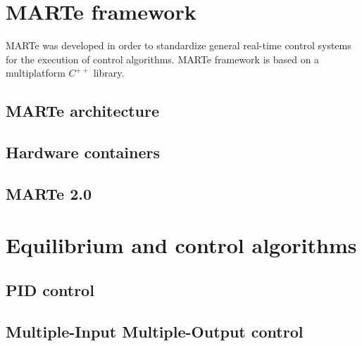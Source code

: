 \section{MARTe framework}

MARTe was developed in order to standardize general real-time control systems for the execution of control algorithms. MARTe framework is based on a multiplatform $C^{++}$ library. \cite{Neto2011} 

\subsection{MARTe architecture }
\subsection{Hardware containers}
\subsection{MARTe 2.0}
\section{Equilibrium and control algorithms} 
\subsection{PID control}
\subsection{Multiple-Input Multiple-Output control}
